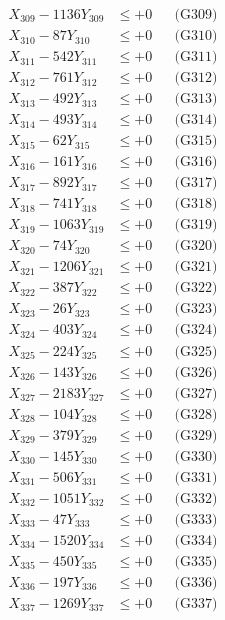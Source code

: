 \documentclass[a4paper,10pt]{article}
\begin{document}
{\begin{align}
X_{309} - 1136Y_{309} &\leq +0 && \text{(G309)} \\
X_{310} - 87Y_{310} &\leq +0 && \text{(G310)} \\
\allowbreak
X_{311} - 542Y_{311} &\leq +0 && \text{(G311)} \\
X_{312} - 761Y_{312} &\leq +0 && \text{(G312)} \\
X_{313} - 492Y_{313} &\leq +0 && \text{(G313)} \\
X_{314} - 493Y_{314} &\leq +0 && \text{(G314)} \\
X_{315} - 62Y_{315} &\leq +0 && \text{(G315)} \\
X_{316} - 161Y_{316} &\leq +0 && \text{(G316)} \\
X_{317} - 892Y_{317} &\leq +0 && \text{(G317)} \\
X_{318} - 741Y_{318} &\leq +0 && \text{(G318)} \\
X_{319} - 1063Y_{319} &\leq +0 && \text{(G319)} \\
X_{320} - 74Y_{320} &\leq +0 && \text{(G320)} \\
\allowbreak
X_{321} - 1206Y_{321} &\leq +0 && \text{(G321)} \\
X_{322} - 387Y_{322} &\leq +0 && \text{(G322)} \\
X_{323} - 26Y_{323} &\leq +0 && \text{(G323)} \\
X_{324} - 403Y_{324} &\leq +0 && \text{(G324)} \\
X_{325} - 224Y_{325} &\leq +0 && \text{(G325)} \\
X_{326} - 143Y_{326} &\leq +0 && \text{(G326)} \\
X_{327} - 2183Y_{327} &\leq +0 && \text{(G327)} \\
X_{328} - 104Y_{328} &\leq +0 && \text{(G328)} \\
X_{329} - 379Y_{329} &\leq +0 && \text{(G329)} \\
X_{330} - 145Y_{330} &\leq +0 && \text{(G330)} \\
\allowbreak
X_{331} - 506Y_{331} &\leq +0 && \text{(G331)} \\
X_{332} - 1051Y_{332} &\leq +0 && \text{(G332)} \\
X_{333} - 47Y_{333} &\leq +0 && \text{(G333)} \\
X_{334} - 1520Y_{334} &\leq +0 && \text{(G334)} \\
X_{335} - 450Y_{335} &\leq +0 && \text{(G335)} \\
X_{336} - 197Y_{336} &\leq +0 && \text{(G336)} \\
X_{337} - 1269Y_{337} &\leq +0 && \text{(G337)} \\

\end{align}}
\end{document}
